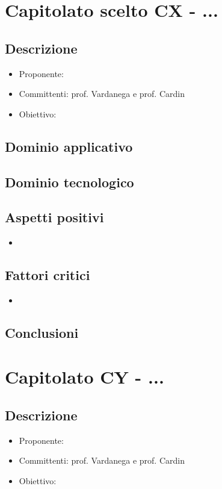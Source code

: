 \section{Capitolato scelto CX - ...}
\subsection{Descrizione}
\begin{itemize}
    \setlength\itemsep{0em}
    \item Proponente: 
    \item Committenti: prof. Vardanega e prof. Cardin
    \item Obiettivo:
\end{itemize}

\subsection{Dominio applicativo}

\subsection{Dominio tecnologico}

\subsection{Aspetti positivi}
\begin{itemize}
    \setlength\itemsep{0em}
    \item 
\end{itemize}

\subsection{Fattori critici}
\begin{itemize}
    \setlength\itemsep{0em}
    \item 
\end{itemize}

\subsection{Conclusioni}


\section{Capitolato CY - ...}
\subsection{Descrizione}
\begin{itemize}
    \setlength\itemsep{0em}
    \item Proponente: 
    \item Committenti: prof. Vardanega e prof. Cardin
    \item Obiettivo:
\end{itemize}

